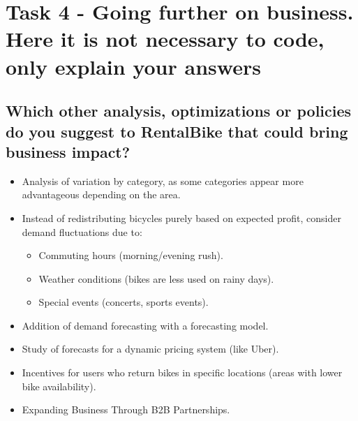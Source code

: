 \documentclass{article}
\begin{document}
	\section{Task 4 - Going further on business. Here it is not necessary to code, only explain your answers}
	
	\subsection{ Which other analysis, optimizations or policies do you suggest to RentalBike that could bring business impact?}
	
	\begin{itemize}
		\item Analysis of variation by category, as some categories appear more advantageous depending on the area.
		\item Instead of redistributing bicycles purely based on expected profit, consider demand fluctuations due to:
			\begin{itemize}
			\item Commuting hours (morning/evening rush).
			\item Weather conditions (bikes are less used on rainy days).
			\item Special events (concerts, sports events).
			\end{itemize}
		\item Addition of demand forecasting with a forecasting model.
		\item Study of forecasts for a dynamic pricing system (like Uber).
		\item Incentives for users who return bikes in specific locations (areas with lower bike availability).
		\item Expanding Business Through B2B Partnerships.
	\end{itemize}
	
	
\end{document}
